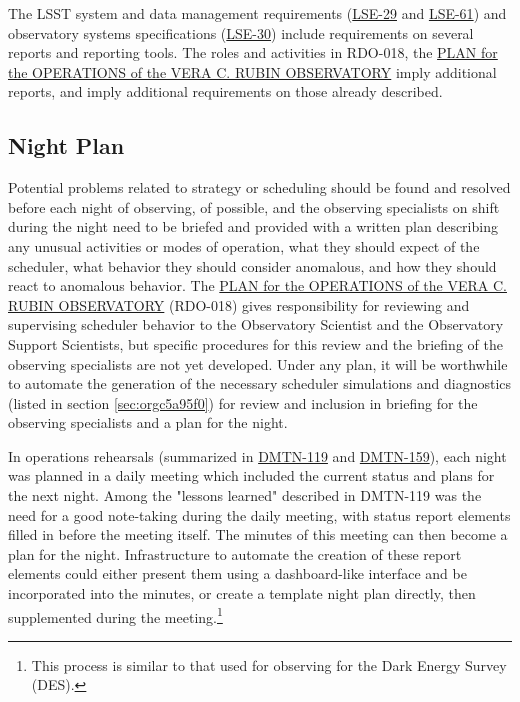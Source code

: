 The LSST system and data management requirements (\href{https://ls.st/lse-29}{LSE-29} and \href{https://ls.st/lse-61}{LSE-61}) and observatory systems specifications (\href{https://ls.st/lse-30}{LSE-30}) include requirements on several reports and reporting tools. The roles and activities in RDO-018, the \href{https://docushare.lsst.org/docushare/dsweb/Get/RDO-018}{PLAN for the OPERATIONS of the VERA C. RUBIN OBSERVATORY} imply additional reports, and imply additional requirements on those already described.

\subsection{Night Plan}
\label{sec:org3047e4d}

Potential problems related to strategy or scheduling should be found and resolved before each night of observing, of possible, and the observing specialists on shift during the night need to be briefed and provided with a written plan describing any unusual activities or modes of operation, what they should expect of the scheduler, what behavior they should consider anomalous, and how they should react to anomalous behavior.
The \href{https://docushare.lsst.org/docushare/dsweb/Get/RDO-018}{PLAN for the OPERATIONS of the VERA C. RUBIN OBSERVATORY} (RDO-018) gives responsibility for reviewing and supervising scheduler behavior to the Observatory Scientist and the Observatory Support Scientists, but specific procedures for this review and the briefing of the observing specialists are not yet developed.
Under any plan, it will be worthwhile to automate the generation of the necessary scheduler simulations and diagnostics (listed in section \ref{sec:orgc5a95f0}) for review and inclusion in briefing for the observing specialists and a plan for the night.

In operations rehearsals (summarized in \href{https://dmtn-119.lsst.io}{DMTN-119} and \href{https://dmtn-159.lsst.io/}{DMTN-159}), each night was planned in a daily meeting which included the current status and plans for the next night.
Among the "lessons learned" described in DMTN-119 was the need for a good note-taking during the daily meeting, with status report elements filled in before the meeting itself. 
The minutes of this meeting can then become a plan for the night.
Infrastructure to automate the creation of these report elements could either present them using a dashboard-like interface and be incorporated into the minutes, or create a template night plan directly, then supplemented during the meeting.\footnote{This process is similar to that used for observing for the Dark Energy Survey (DES).}

